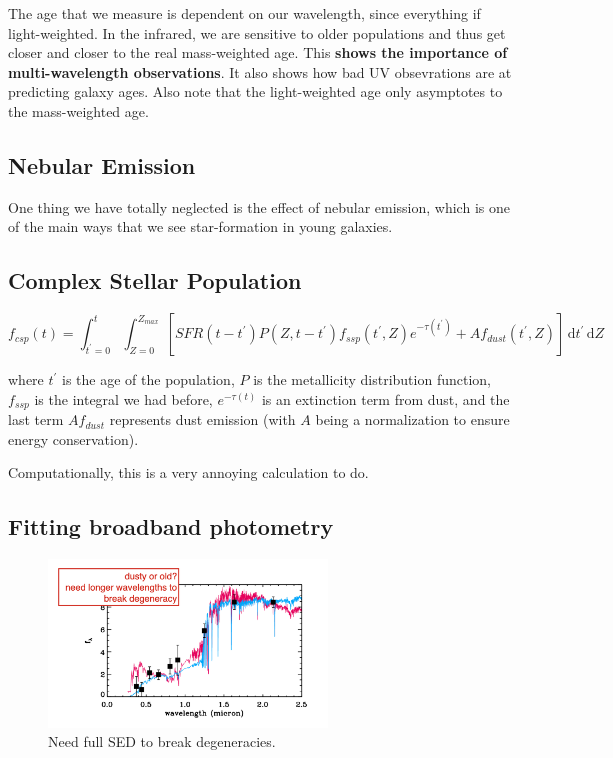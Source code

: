 \documentclass{article}
\begin{document}
The age that we measure is dependent on our wavelength, since everything if light-weighted. In the infrared, we are sensitive to older populations and thus get closer and closer to the real mass-weighted age. This \textbf{shows the importance of multi-wavelength observations}. It also shows how bad UV obsevrations are at predicting galaxy ages. Also note that the light-weighted age only asymptotes to the mass-weighted age. 

\subsection{Nebular Emission}

One thing we have totally neglected is the effect of nebular emission, which is one of the main ways that we see star-formation in young galaxies. 

\subsection{Complex Stellar Population}

\begin{equation}
    f_{csp}(t) = \int_{t^\prime=0}^{t}\int_{Z=0}^{Z_{max}} \left[SFR(t-t^\prime) P(Z,t-t^\prime) f_{ssp}(t^\prime,Z) e^{-\tau(t^\prime)} + Af_{dust}(t^\prime,Z)\right] \, \mathrm{d}t^\prime \, \mathrm{d} Z
\end{equation}

where $t^\prime$ is the age of the population, $P$ is the metallicity distribution function, $f_{ssp}$ is the integral we had before, $e^{-\tau(t)}$ is an extinction term from dust, and the last term $Af_{dust}$ represents dust emission (with $A$ being a normalization to ensure energy conservation).

Computationally, this is a very annoying calculation to do. 

\subsection{Fitting broadband photometry}

\begin{figure}
    \centering
    \includegraphics[width=0.66\textwidth]{figs/Screen Shot 2021-09-24 at 9.34.14 AM.png}
    \caption{Need full SED to break degeneracies.}
    \label{fig:Z_degen}
\end{figure}
\end{document}
